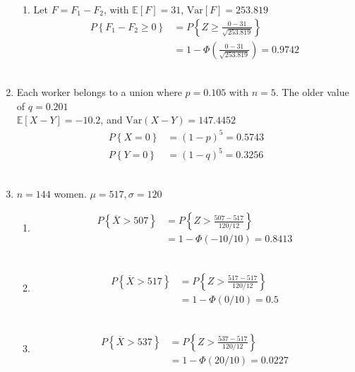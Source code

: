 \begin{enumerate}
\begin{enumerate}
			\item Let $ F = F_1 - F_2 $, with $ \mathbb{E}[F] = 31$, $ \mathrm{Var}[F] = 253.819$
			\begin{align}
				P \left\{F_1 - F_2 \geq 0 \right\} &= P \left\{Z \geq \frac{0 - 31}{\sqrt{253.819}} \right\} \nonumber \\
				&= 1 - \Phi \left( \frac{0 - 31}{\sqrt{253.819}} \right) = 0.9742
			\end{align} \\
			
		\end{enumerate}
	
	
	\item Each worker belongs to a union where $ p = 0.105 $ with $ n = 5 $. The older value of $ q = 0.201 $\\
	$ \mathbb{E}[X-Y] = -10.2 $, and $\mathrm{Var}(X-Y) = 147.4452$\\
	
		\begin{align}
			P \left\{X = 0 \right\} &= (1-p)^5 = 0.5743 \\
			P \left\{Y = 0 \right\} &= (1-q)^5 = 0.3256
		\end{align} \\
	
	
	\item $ n = 144 $ women. $ \mu = 517, \sigma = 120 $ \\
	
		\begin{enumerate}
			\item 			
			\begin{align}
				P \left\{\overline{X} > 507 \right\} &= P \left\{Z > \frac{507 - 517}{120/12} \right\} \nonumber \\
				&= 1 - \Phi (-10/10) = 0.8413
			\end{align} \\
			
			\item 			
			\begin{align}
				P \left\{\overline{X} > 517 \right\} &= P \left\{Z > \frac{517 - 517}{120/12} \right\} \nonumber \\
				&= 1 - \Phi (0/10) = 0.5
			\end{align} \\
			
			
			\item 			
			\begin{align}
				P \left\{\overline{X} > 537 \right\} &= P \left\{Z > \frac{537 - 517}{120/12} \right\} \nonumber \\
				&= 1 - \Phi (20/10) = 0.0227
			\end{align} \\
			

\end{enumerate}
\end{enumerate}
